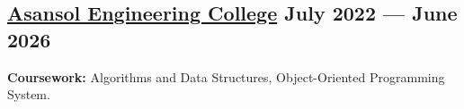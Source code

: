 



\subsection{{\href{https://www.aecwb.edu.in}{Asansol Engineering College} \hfill July 2022 --- June 2026}}
\begin{null}

\end{null}

\vspace{0.25em}
\subtext{}\textbf{Coursework:} Algorithms and Data Structures, Object-Oriented Programming System.
\vspace{0.2em}
\begin{null}
\end{null}


\begin{null}

\end{null}


\begin{null}

\end{null}